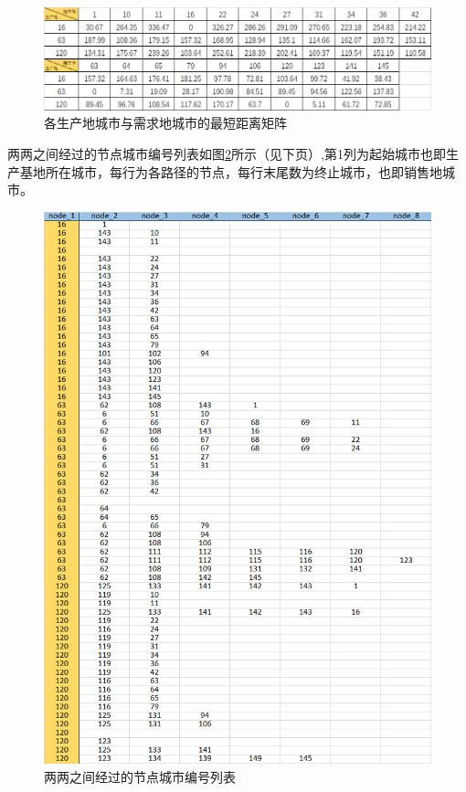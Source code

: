 \documentclass{article}
\begin{document}
	 \begin{figure}[htpb]
	 	\centering
	 	\includegraphics[width=1.0\linewidth]{img/jvli.png}
	 	\caption{各生产地城市与需求地城市的最短距离矩阵}
	 	\label{fig:jvli}
	 \end{figure}
      两两之间经过的节点城市编号列表如图\ref{fig:node}所示（见下页）,第1列为起始城市也即生产基地所在城市，每行为各路径的节点，每行末尾数为终止城市，也即销售地城市。
     \begin{figure}[htpb]
     	\centering
     	\includegraphics[width=0.95\linewidth]{img/node.png}
     	\caption{两两之间经过的节点城市编号列表}
     	\label{fig:node}
     \end{figure}
	 
\end{document}
